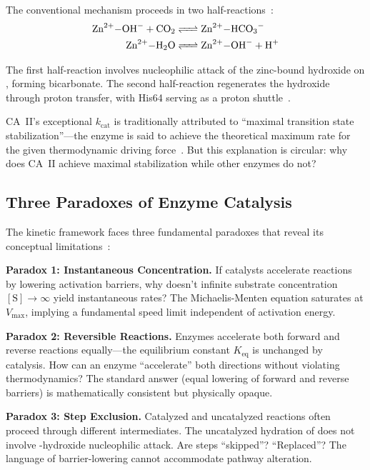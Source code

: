 \documentclass[twocolumn,amsmath,amssymb,aps,prb,superscriptaddress,longbibliography]{revtex4-2}
\newcommand{\kcat}{k_{\mathrm{cat}}}
\newcommand{\Vmax}{V_{\mathrm{max}}}
\begin{document}
The conventional mechanism proceeds in two half-reactions~\cite{Silverman1988, Krishnamurthy2008}:
\begin{align}
\ce{Zn^{2+}-OH- + CO2 &<=> Zn^{2+}-HCO3-} \label{eq:half1} \\
\ce{Zn^{2+}-H2O &<=> Zn^{2+}-OH- + H+} \label{eq:half2}
\end{align}

The first half-reaction involves nucleophilic attack of the zinc-bound hydroxide on , forming bicarbonate. The second half-reaction regenerates the hydroxide through proton transfer, with His64 serving as a proton shuttle~\cite{Tu1989, Maupin2009, Mikulski2010}.

CA~II's exceptional $\kcat$ is traditionally attributed to ``maximal transition state stabilization''---the enzyme is said to achieve the theoretical maximum rate for the given thermodynamic driving force~\cite{Silverman1988}. But this explanation is circular: why does CA~II achieve maximal stabilization while other enzymes do not?

\subsection{Three Paradoxes of Enzyme Catalysis}

The kinetic framework faces three fundamental paradoxes that reveal its conceptual limitations~\cite{Sachikonye2025}:

\textbf{Paradox 1: Instantaneous Concentration.} If catalysts accelerate reactions by lowering activation barriers, why doesn't infinite substrate concentration $[\text{S}] \to \infty$ yield instantaneous rates? The Michaelis-Menten equation saturates at $\Vmax$, implying a fundamental speed limit independent of activation energy.

\textbf{Paradox 2: Reversible Reactions.} Enzymes accelerate both forward and reverse reactions equally---the equilibrium constant $K_{\text{eq}}$ is unchanged by catalysis. How can an enzyme ``accelerate'' both directions without violating thermodynamics? The standard answer (equal lowering of forward and reverse barriers) is mathematically consistent but physically opaque.

\textbf{Paradox 3: Step Exclusion.} Catalyzed and uncatalyzed reactions often proceed through different intermediates. The uncatalyzed hydration of  does not involve -hydroxide nucleophilic attack. Are steps ``skipped''? ``Replaced''? The language of barrier-lowering cannot accommodate pathway alteration.
\end{document}
